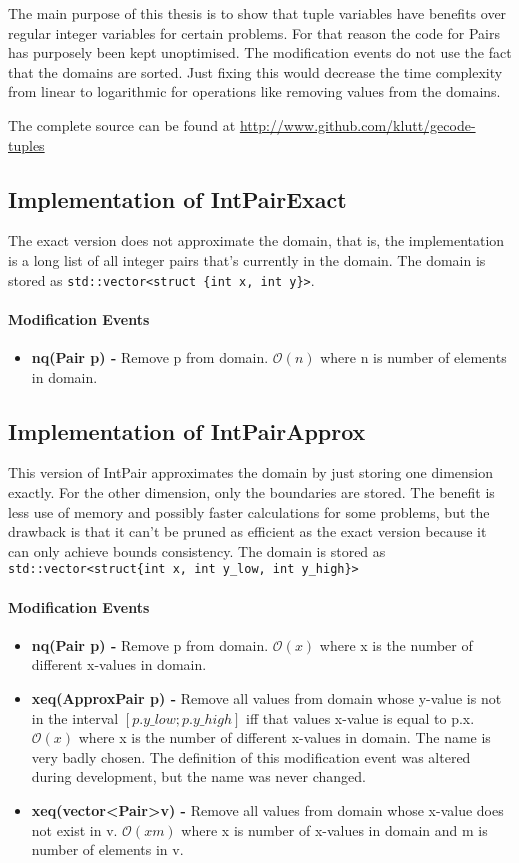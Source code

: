 \documentclass[a4paper,11pt]{article}
\begin{document}
The main purpose of this thesis is to show that tuple variables have benefits over regular integer variables for certain problems. For that reason the code for Pairs has purposely been kept unoptimised. The modification events do not use the fact that the domains are sorted. Just fixing this would decrease the time complexity from linear to logarithmic for operations like removing values from the domains.

The complete source can be found at \url{http://www.github.com/klutt/gecode-tuples}

\subsection{Implementation of IntPairExact}
The exact version does not approximate the domain, that is, the implementation is a long list of all integer pairs that's currently in the domain. The domain is stored as \texttt{std::vector<struct \{int x, int y\}>}. 

\paragraph{Modification Events}
\begin{itemize}
\item {\textbf{nq(Pair p) - }} Remove p from domain. $\mathcal{O}(n)$ where n is number of elements in domain.
\end{itemize}
\subsection{Implementation of IntPairApprox}
This version of IntPair approximates the domain by just storing one dimension exactly. For the other dimension, only the boundaries are stored. The benefit is less use of memory and possibly faster calculations for some problems, but the drawback is that it can't be pruned as efficient as the exact version because it can only achieve bounds consistency. The domain is stored as \texttt{std::vector<struct\{int x, int y\_low, int y\_high\}>}

\paragraph{Modification Events}
\begin{itemize}
\item {\textbf{nq(Pair p) - }} Remove p from domain. $\mathcal{O}(x)$ where x is the number of different x-values in domain.
\item{\textbf{xeq(ApproxPair p) - }} Remove all values from domain whose y-value is not in the interval $[p.y\_low; p.y\_high]$ iff that values x-value is equal to p.x. $\mathcal{O}(x)$ where x is the number of different x-values in domain. The name is very badly chosen. The definition of this modification event was altered during development, but the name was never changed.
\item{\textbf{xeq(vector\textless Pair\textgreater v) - }} Remove all values from domain whose x-value does not exist in v. $\mathcal{O}(xm)$ where x is number of x-values in domain and m is number of elements in v.
\end{itemize}
\end{document}
